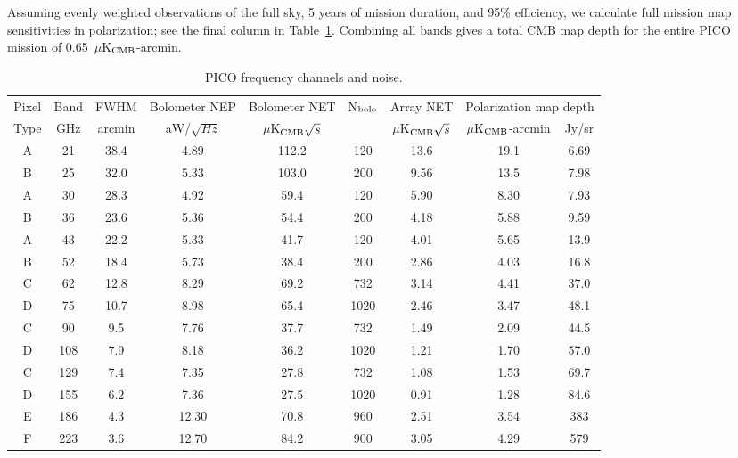 \documentclass[]{spie}  %
\begin{document}
Assuming evenly weighted observations 
of the full sky, 5 years of mission duration, and 95\% efficiency, we calculate full mission map sensitivities in polarization; see the 
final column in Table~\ref{tab:noise}. 
Combining all bands gives a total CMB map depth for the entire PICO mission of 0.65~$\mu$K$_{\rm CMB}$-arcmin. 

\begin{table}[ht]
\centering
\caption{PICO frequency channels and noise. }
\label{tab:noise}
\begin{tabular}{|c|c|c|c|c|c|c|cc|}
\hline
Pixel  & Band  & FWHM   & Bolometer NEP & Bolometer NET        & N$_{\rm bolo}$ & Array NET         & \multicolumn{2}{|c|}{Polarization map depth}  \\
Type  & GHz   & arcmin    & aW/$\sqrt{Hz}$ & $\mu$K$_{\rm CMB} \sqrt{s}$ &            & $\mu$K$_{\rm CMB}\sqrt{s}$ & $\mu$K$_{\rm CMB}$-arcmin & Jy/sr     \\ \hline
A        & 21  & 38.4 & 4.89   & 112.2   & 120   & 13.6  & 19.1  & 6.69 \\
B        & 25  & 32.0 & 5.33   & 103.0   & 200   & 9.56   & 13.5 & 7.98  \\
A        & 30  & 28.3 & 4.92   & 59.4    & 120   & 5.90   & 8.30 & 7.93   \\
B        & 36  & 23.6 & 5.36   & 54.4    & 200   & 4.18   & 5.88 & 9.59   \\
A        & 43  & 22.2 & 5.33   & 41.7    & 120   & 4.01   & 5.65 & 13.9   \\
B        & 52  & 18.4 & 5.73   & 38.4    & 200   & 2.86   & 4.03 & 16.8   \\
C        & 62  & 12.8 & 8.29   & 69.2    & 732   & 3.14   & 4.41 & 37.0   \\
D        & 75  & 10.7 & 8.98   & 65.4    & 1020  & 2.46   & 3.47 & 48.1   \\
C        & 90  & 9.5  & 7.76    & 37.7    & 732   & 1.49   & 2.09 & 44.5   \\
D        & 108 & 7.9  & 8.18   & 36.2    & 1020  & 1.21   & 1.70 & 57.0   \\
C        & 129 & 7.4  & 7.35   & 27.8    & 732   & 1.08   & 1.53 & 69.7   \\
D        & 155 & 6.2  & 7.36   & 27.5    & 1020  & 0.91   & 1.28 & 84.6   \\
E        & 186 & 4.3  & 12.30 & 70.8    & 960   & 2.51   & 3.54 & 383    \\
F        & 223 & 3.6  & 12.70 & 84.2    & 900   & 3.05   & 4.29 & 579    \\

\end{tabular}
\end{table}
\end{document}
